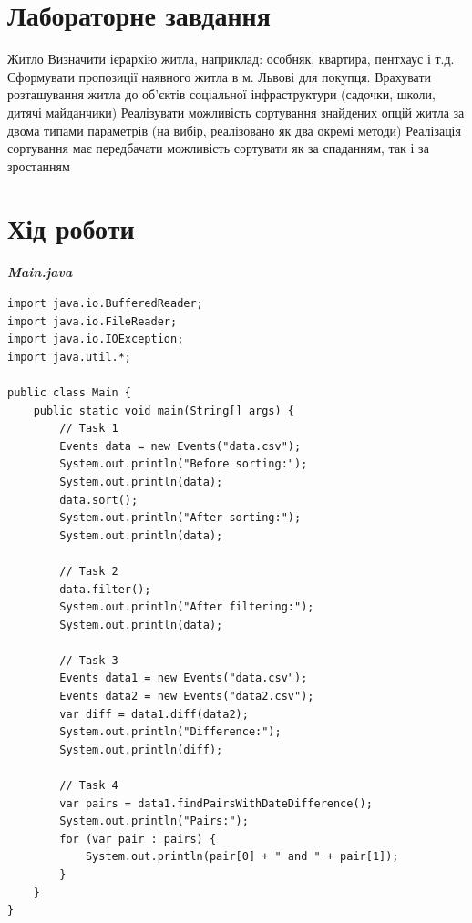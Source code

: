 \documentclass[14pt]{extreport}
\begin{document}
\begin{normalsize}
	\section*{Лабораторне завдання}
	Житло Визначити ієрархію житла, наприклад: особняк, квартира, пентхаус і т.д.
	Сформувати пропозиції наявного житла в м. Львові для покупця. Врахувати
	розташування житла до об’єктів соціальної інфраструктури (садочки, школи, дитячі
	майданчики)
	Реалізувати можливість сортування знайдених опцій житла за двома типами
	параметрів (на вибір, реалізовано як два окремі методи)
	Реалізація сортування має передбачати можливість сортувати як за спаданням, так
	і за зростанням
	
	\section*{Хід роботи}

	\textbf{\textit{Main.java}}
	\begin{lstlisting}
import java.io.BufferedReader;
import java.io.FileReader;
import java.io.IOException;
import java.util.*;

public class Main {
	public static void main(String[] args) {
		// Task 1
		Events data = new Events("data.csv");
		System.out.println("Before sorting:");
		System.out.println(data);
		data.sort();
		System.out.println("After sorting:");
		System.out.println(data);
		
		// Task 2
		data.filter();
		System.out.println("After filtering:");
		System.out.println(data);
		
		// Task 3
		Events data1 = new Events("data.csv");
		Events data2 = new Events("data2.csv");
		var diff = data1.diff(data2);
		System.out.println("Difference:");
		System.out.println(diff);
		
		// Task 4
		var pairs = data1.findPairsWithDateDifference();
		System.out.println("Pairs:");
		for (var pair : pairs) {
			System.out.println(pair[0] + " and " + pair[1]);
		}
	}
}


\end{lstlisting}
\end{normalsize}
\end{document}
